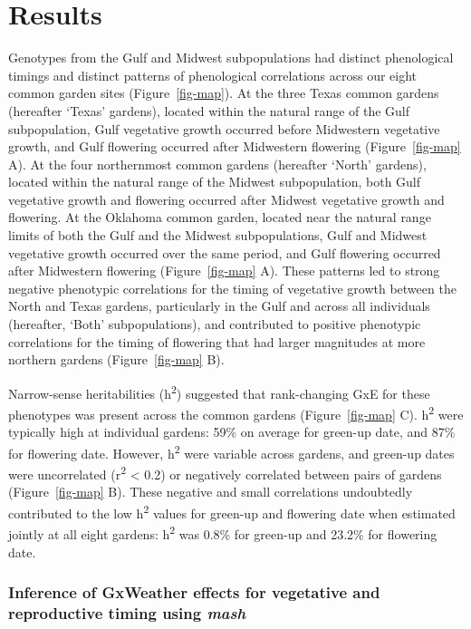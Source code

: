 \documentclass[
  9pt,
  twocolumn,
  twoside]{pnas-new}
\begin{document}
\section{Results}\label{results}

Genotypes from the Gulf and Midwest subpopulations had distinct
phenological timings and distinct patterns of phenological correlations
across our eight common garden sites (Figure~\ref{fig-map}). At the
three Texas common gardens (hereafter `Texas' gardens), located within
the natural range of the Gulf subpopulation, Gulf vegetative growth
occurred before Midwestern vegetative growth, and Gulf flowering
occurred after Midwestern flowering (Figure~\ref{fig-map} A). At the
four northernmost common gardens (hereafter `North' gardens), located
within the natural range of the Midwest subpopulation, both Gulf
vegetative growth and flowering occurred after Midwest vegetative growth
and flowering. At the Oklahoma common garden, located near the natural
range limits of both the Gulf and the Midwest subpopulations, Gulf and
Midwest vegetative growth occurred over the same period, and Gulf
flowering occurred after Midwestern flowering (Figure~\ref{fig-map} A).
These patterns led to strong negative phenotypic correlations for the
timing of vegetative growth between the North and Texas gardens,
particularly in the Gulf and across all individuals (hereafter, `Both'
subpopulations), and contributed to positive phenotypic correlations for
the timing of flowering that had larger magnitudes at more northern
gardens (Figure~\ref{fig-map} B).

Narrow-sense heritabilities (h\textsuperscript{2}) suggested that
rank-changing GxE for these phenotypes was present across the common
gardens (Figure~\ref{fig-map} C). h\textsuperscript{2} were typically
high at individual gardens: 59\% on average for green-up date, and 87\%
for flowering date. However, h\textsuperscript{2} were variable across
gardens, and green-up dates were uncorrelated (r\textsuperscript{2}
\textless{} 0.2) or negatively correlated between pairs of gardens
(Figure~\ref{fig-map} B). These negative and small correlations
undoubtedly contributed to the low h\textsuperscript{2} values for
green-up and flowering date when estimated jointly at all eight gardens:
h\textsuperscript{2} was 0.8\% for green-up and 23.2\% for flowering
date.

\subsubsection{\texorpdfstring{Inference of GxWeather effects for
vegetative and reproductive timing using
\emph{mash}}{Inference of GxWeather effects for vegetative and reproductive timing using mash}}\label{inference-of-gxweather-effects-for-vegetative-and-reproductive-timing-using-mash}
\end{document}
